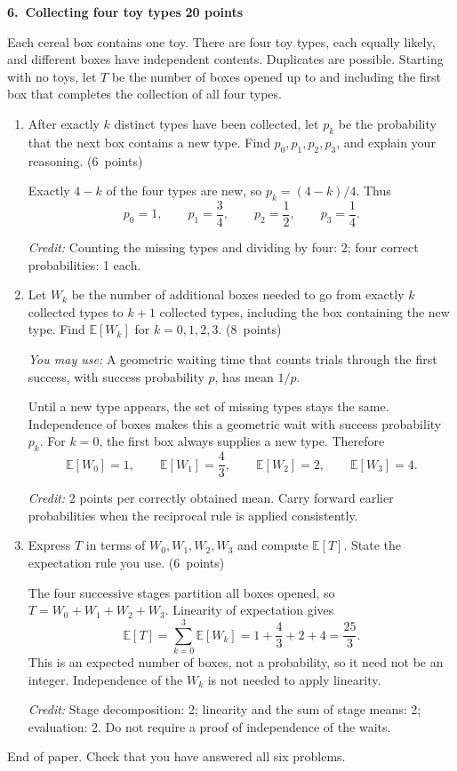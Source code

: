 \documentclass[11pt,letterpaper]{article}
\newcommand{\E}{\mathbb E}
\newcommand{\partpts}[1]{\unskip\nobreak\hspace{.3em}%
  \mbox{\small\color{muted}(#1 points)}}
\newcommand{\credit}[1]{\par{\footnotesize\color{muted}\textit{Credit:} #1}}
\newcommand{\problem}[3]{\par\addvspace{9pt}%
  {\large\bfseries\color{indigo}#1.\ #2}\hfill
  {\small\color{muted}\textbf{#3 points}}\par\nobreak}
\begin{document}
\newpage
\problem{6}{Collecting four toy types}{20}
Each cereal box contains one toy. There are four toy types, each equally
likely, and different boxes have independent contents. Duplicates are possible.
Starting with no toys, let $T$ be the number of boxes opened up to and
including the first box that completes the collection of all four types.
\begin{enumerate}
\item After exactly $k$ distinct types have been collected, let $p_k$
be the probability that the next box contains a new type. Find
$p_0,p_1,p_2,p_3$, and explain your reasoning. \partpts{6}
\begin{solution}[1.3in]
Exactly $4-k$ of the four types are new, so $p_k=(4-k)/4$.
Thus
\[
p_0=1,\qquad p_1=\frac34,\qquad p_2=\frac12,\qquad p_3=\frac14.
\]
\credit{Counting the missing types and dividing by four: 2;
four correct probabilities: 1 each.}
\end{solution}
\item Let $W_k$ be the number of additional boxes needed to go from
exactly $k$ collected types to $k+1$ collected types, including the
box containing the new type. Find $\E[W_k]$ for $k=0,1,2,3$.
\partpts{8}

\textit{You may use:} A geometric waiting time that counts trials
through the first success, with success probability $p$, has mean $1/p$.
\begin{solution}[1.6in]
Until a new type appears, the set of missing types stays the same.
Independence of boxes makes this a geometric wait with success
probability $p_k$. For $k=0$, the first box always supplies a new type.
Therefore
\[
\E[W_0]=1,\qquad \E[W_1]=\frac43,\qquad
\E[W_2]=2,\qquad \E[W_3]=4.
\]
\credit{2 points per correctly obtained mean. Carry forward earlier
probabilities when the reciprocal rule is applied consistently.}
\end{solution}
\item Express $T$ in terms of $W_0,W_1,W_2,W_3$ and compute $\E[T]$.
State the expectation rule you use. \partpts{6}
\begin{solution}[1.8in]
The four successive stages partition all boxes opened, so
$T=W_0+W_1+W_2+W_3$. Linearity of expectation gives
\[
\E[T]=\sum_{k=0}^3\E[W_k]
=1+\frac43+2+4=\frac{25}{3}.
\]
This is an expected number of boxes, not a probability, so it need not
be an integer. Independence of the $W_k$ is not needed to apply linearity.
\credit{Stage decomposition: 2; linearity and the sum of stage means: 2;
evaluation: 2. Do not require a proof of independence of the waits.}
\end{solution}
\end{enumerate}
\vfill
\begin{center}\small\color{muted}End of paper. Check that you have answered all six problems.\end{center}
\label{exam-last-page}
\end{document}
